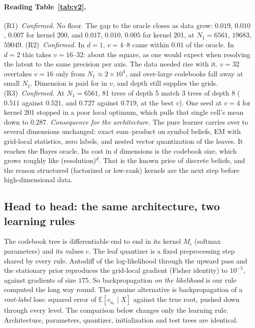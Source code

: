 \documentclass[11pt]{article}
\theoremstyle{definition}
\newcommand{\E}{\mathbb{E}}
\begin{document}
\paragraph{Reading Table~\ref{tab:v2}.}
(R1)~\emph{Confirmed.} No floor. The gap to the oracle closes as data grow: $0.019$, $0.010$, $0.007$ for
kernel 200, and $0.017$, $0.010$, $0.005$ for kernel 201, at $N_1=6561$, $19683$, $59049$.
(R2)~\emph{Confirmed.} In $d=1$, $v=4$--$8$ came within $0.01$ of the oracle. In $d=2$ this takes
$v=16$--$32$: about the square, as one would expect when resolving the latent to the same precision per
axis. The data needed rise with it. $v=32$ overtakes $v=16$ only from $N_1\approx2\times10^4$, and
over-large codebooks fall away at small $N_1$. Dimension is paid for in $v$, and depth still supplies the
grids.
(R3)~\emph{Confirmed.} At $N_1=6561$, 81 trees of depth 5 match 3 trees of depth 8 ($0.511$ against
$0.521$, and $0.727$ against $0.719$, at the best $v$). One seed at $v=4$ for kernel 201 stopped in a poor
local optimum, which pulls that single cell's mean down to $0.287$.
\emph{Consequence for the architecture.} The pure learner carries over to several dimensions unchanged:
exact sum--product on symbol beliefs, EM with grid-local statistics, zero labels, and nested vector
quantization of the leaves. It reaches the Bayes oracle. Its cost in $d$ dimensions is the codebook
size, which grows roughly like (resolution)$^d$. That is the known price of discrete beliefs, and the
reason structured (factorized or low-rank) kernels are the next step before high-dimensional data.

\subsection{Head to head: the same architecture, two learning rules}\label{sec:h2h-ngt}
The codebook tree is differentiable end to end in its kernel $M_i$ (softmax parameters) and its values
$c$. The leaf quantizer is a fixed preprocessing step shared by every rule. Autodiff of the
log-likelihood through the upward pass and the stationary prior reproduces the grid-local gradient
(Fisher identity) to $10^{-5}$, against gradients of size $175$. So backpropagation \emph{on the
likelihood} is our rule computed the long way round. The genuine alternative is backpropagation of a
\emph{root-label} loss: squared error of $\E[c_{a_\epsilon}\mid X]$ against the true root, pushed down through
every level. The comparison below changes only the learning rule. Architecture, parameters,
quantizer, initialization and test trees are identical.
\end{document}
